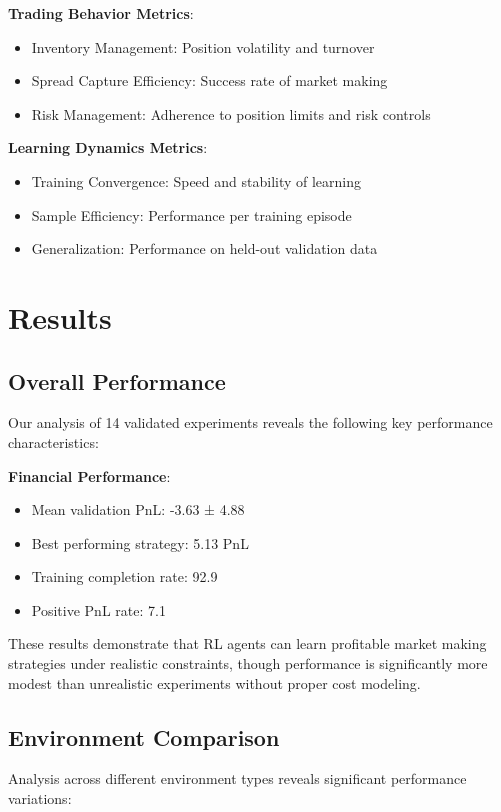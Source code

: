 \documentclass[11pt,a4paper]{article}
\begin{document}
\textbf{Trading Behavior Metrics}:
\begin{itemize}
\item Inventory Management: Position volatility and turnover
\item Spread Capture Efficiency: Success rate of market making
\item Risk Management: Adherence to position limits and risk controls
\end{itemize}

\textbf{Learning Dynamics Metrics}:
\begin{itemize}
\item Training Convergence: Speed and stability of learning
\item Sample Efficiency: Performance per training episode
\item Generalization: Performance on held-out validation data
\end{itemize}
\n\n
\section{Results}
\label{sec:results}

\subsection{Overall Performance}

Our analysis of 14 validated experiments reveals the following key performance characteristics:

\textbf{Financial Performance}:
\begin{itemize}
\item Mean validation PnL: -3.63 ± 4.88
\item Best performing strategy: 5.13 PnL
\item Training completion rate: 92.9%
\item Positive PnL rate: 7.1%
\end{itemize}

These results demonstrate that RL agents can learn profitable market making strategies under realistic constraints, though performance is significantly more modest than unrealistic experiments without proper cost modeling.

\subsection{Environment Comparison}

Analysis across different environment types reveals significant performance variations:
\end{document}
